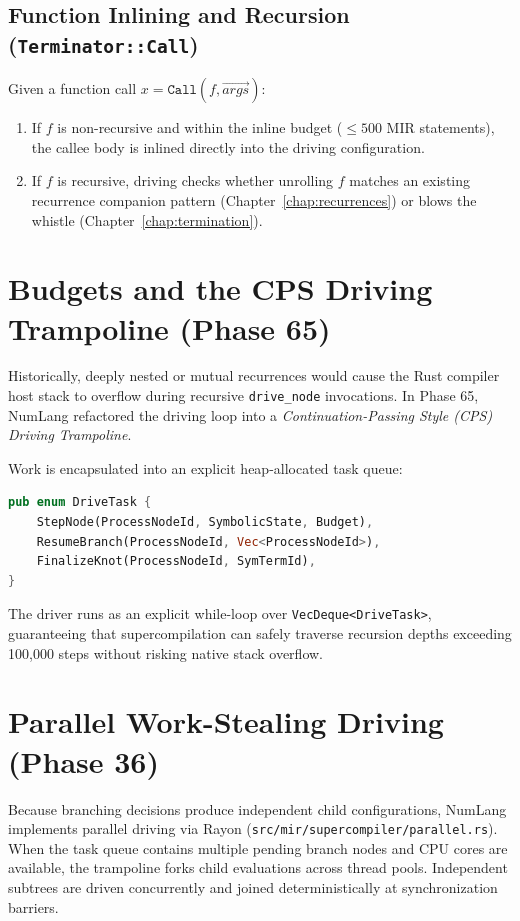 \subsection{Function Inlining and Recursion (\texttt{Terminator::Call})}
Given a function call $x = \mathtt{Call}(f, \vec{args})$:
\begin{enumerate}
    \item If $f$ is non-recursive and within the inline budget ($\le 500$ MIR statements), the callee body is inlined directly into the driving configuration.
    \item If $f$ is recursive, driving checks whether unrolling $f$ matches an existing recurrence companion pattern (Chapter~\ref{chap:recurrences}) or blows the whistle (Chapter~\ref{chap:termination}).
\end{enumerate}

\section{Budgets and the CPS Driving Trampoline (Phase 65)}
\label{sec:driving:cps}

Historically, deeply nested or mutual recurrences would cause the Rust compiler host stack to overflow during recursive \texttt{drive\_node} invocations. In Phase 65, NumLang refactored the driving loop into a \emph{Continuation-Passing Style (CPS) Driving Trampoline}.

Work is encapsulated into an explicit heap-allocated task queue:
\begin{lstlisting}[language=Rust, caption={The CPS DriveTask queue in NumLang.}]
pub enum DriveTask {
    StepNode(ProcessNodeId, SymbolicState, Budget),
    ResumeBranch(ProcessNodeId, Vec<ProcessNodeId>),
    FinalizeKnot(ProcessNodeId, SymTermId),
}
\end{lstlisting}
The driver runs as an explicit while-loop over \texttt{VecDeque<DriveTask>}, guaranteeing that supercompilation can safely traverse recursion depths exceeding 100,000 steps without risking native stack overflow.

\section{Parallel Work-Stealing Driving (Phase 36)}
\label{sec:driving:parallel}

Because branching decisions produce independent child configurations, NumLang implements parallel driving via Rayon (\texttt{src/mir/supercompiler/parallel.rs}). When the task queue contains multiple pending branch nodes and CPU cores are available, the trampoline forks child evaluations across thread pools. Independent subtrees are driven concurrently and joined deterministically at synchronization barriers.

